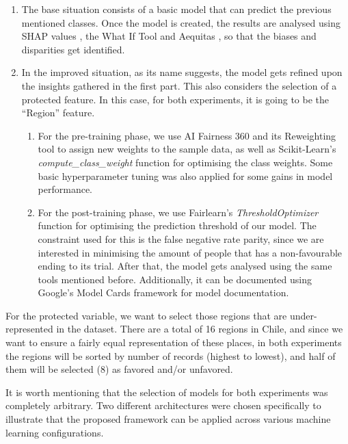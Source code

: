 \documentclass[twoside,11pt]{article}
\begin{document}
\begin{enumerate}
    \item The base situation consists of a basic model that can predict the previous mentioned classes. Once the model is created, the results are analysed using SHAP values , the What If Tool  and Aequitas , so that the biases and disparities get identified.

    \item In the improved situation, as its name suggests, the model gets refined upon the insights gathered in the first part. This also considers the selection of a protected feature. In this case, for both experiments, it is going to be the ``Region'' feature.

    \begin{enumerate}
        \item For the pre-training phase, we use AI Fairness 360  and its Reweighting tool to assign new weights to the sample data, as well as Scikit-Learn's  \textit{compute\_class\_weight} function for optimising the class weights. Some basic hyperparameter tuning was also applied for some gains in model performance.

        \item For the post-training phase, we use Fairlearn's \textit{ThresholdOptimizer} function for optimising the prediction threshold of our model. The constraint used for this is the false negative rate parity, since we are interested in minimising the amount of people that has a non-favourable ending to its trial. After that, the model gets analysed using the same tools mentioned before. Additionally, it can be documented using Google's Model Cards framework for model documentation.
    \end{enumerate}
\end{enumerate}

For the protected variable, we want to select those regions that are under-represented in the dataset. There are a total of 16 regions in Chile, and since we want to ensure a fairly equal representation of these places, in both experiments the regions will be sorted by number of records (highest to lowest), and half of them will be selected (8) as favored and/or unfavored. 

It is worth mentioning that the selection of models for both experiments was completely arbitrary. Two different architectures were chosen specifically to illustrate that the proposed framework can be applied across various machine learning configurations.
\end{document}
